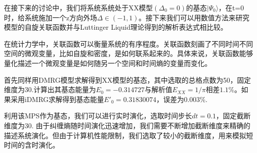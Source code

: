 \documentclass[12pt]{article}
\begin{document}
      在接下来的讨论中，我们将系统系统处于XX模型$(\Delta_0=0)$的基态$|\Psi_0\rangle$，在t=0时，给系统施加一个z方向外场$\Delta\in(-1,1)$。接下来我们可以用数值方法来研究模型的自旋关联函数并与Luttinger Liquid理论得到的解析表达式相比较。
      
      在统计力学中，关联函数可以衡量系统的有序程度。关联函数刻画了不同时间不同空间的微观变量，比如自旋和密度，是如何联系起来的。具体来说，关联函数能够量化描述一个微观变量是如何随另一个空间和时间熵的变量而变化。
      
      首先同样用DMRG模型求解得到XX模型的基态，其中选取的总格点数为50，固定维度为30.计算出其基态能量为$E_0=-0.314727$与解析值$E_{XX}=1/\pi$相差$1.1\%$。如果采用iDMRG求解得到基态能量$E'_0=0.31830074$，误差为$0.003\%$. 
      
      利用该MPS作为基态，我们可以进行实时演化，选取时间步长$dt=0.1$，固定截断维度为30. 由于纠缠熵随时间演化迅速增加，我们需要不断增加截断维度来精确的描述系统演化。但由于计算机性能限制，我们选取了较小的截断维度，用来模拟短时间的含时演化。
      
      
\end{document}
